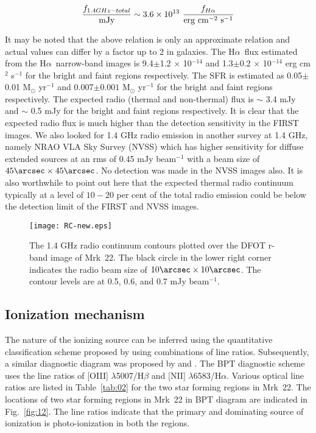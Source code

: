 \documentclass[useAMS,usenatbib]{mn2e}
\def\Ha{H$\alpha$~}
\begin{document}
\begin{equation} 
\frac{f_{1.4GHz - total}}{\rm mJy} \sim 3.6 \times 10^{13}~\frac{f_{H\alpha}}{\rm erg~cm^{-2}~s^{-1}}
\end{equation}

It may be noted that the above relation is only an approximate relation and actual values can differ by a factor up to 2 in galaxies. The \Ha flux estimated from the \Ha narrow-band images is 9.4$\pm$1.2 $\times$ 10$^{-14}$ and 1.3$\pm$0.2 $\times$ 10$^{-14}$ erg cm$^{2}$ s$^{-1}$ for the bright and faint regions respectively. The SFR is estimated as 0.05$\pm$0.01 M$_{\odot}$ yr$^{-1}$ and 0.007$\pm0.001$ M$_{\odot}$ yr$^{-1}$ for the bright and faint regions respectively. The expected radio (thermal and non-thermal) flux is $\sim$ 3.4 mJy and $\sim$ 0.5 mJy for the bright and faint regions respectively. It is clear that the expected radio flux is much higher than the detection sensitivity in the FIRST images. We also looked for 1.4 GHz radio emission in another survey at 1.4 GHz, namely NRAO VLA Sky Survey (NVSS) which has higher sensitivity for diffuse extended sources at an rms of 0.45 mJy beam$^{-1}$ with a beam size of $45\arcsec \times 45\arcsec$. No detection was made in the NVSS images also. It is also worthwhile to point out here that the expected thermal radio continuum typically at a level of $10 - 20$ per cent of the total radio emission could be below the detection limit of the FIRST and NVSS images. 

\begin{figure}
\centering
\texttt{[image: RC-new.eps]}
\caption{The 1.4 GHz radio continuum contours plotted over the DFOT r-band image of Mrk~22. The black circle in the lower right corner indicates the radio beam size of $10\arcsec \times 10\arcsec$. The contour levels are at 0.5, 0.6, and 0.7 mJy beam$^{-1}$.}
\label{fig:11}
\end{figure}
 
\subsection{Ionization mechanism}

The nature of the ionizing source can be inferred using the quantitative classification scheme proposed by \citet{1981PASP...93....5B} using combinations of line ratios. Subsequently, a similar diagnostic diagram was proposed by \citet{2000ApJ...542..224D} and \citet{2001ApJ...556..121K}. The BPT diagnostic scheme uses the line ratios of [O{\small{III}}] $\lambda$5007/H${\beta}$ and [N{\small{II}}] $\lambda$6583/H${\alpha}$. Various optical line ratios are listed in Table~\ref{tab:02} for the two star forming regions in Mrk~22. The locations of two star forming regions in Mrk~22 in BPT diagram are indicated in Fig.~\ref{fig:12}. The line ratios indicate that the primary and dominating source of ionization is photo-ionization in both the regions. 
\end{document}
